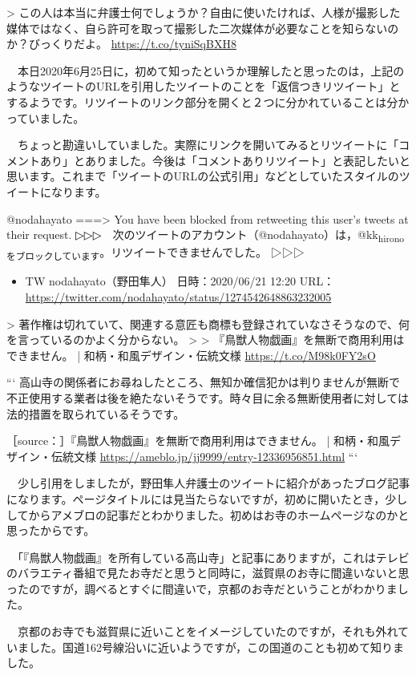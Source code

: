 \documentclass[]{ltjarticle}
\begin{document}
> この人は本当に弁護士何でしょうか？自由に使いたければ、人様が撮影した媒体ではなく、自ら許可を取って撮影した二次媒体が必要なことを知らないのか？びっくりだよ。 \url{https://t.co/tyniSqBXH8}  

　本日2020年6月25日に，初めて知ったというか理解したと思ったのは，上記のようなツイートのURLを引用したツイートのことを「返信つきリツイート」とするようです。リツイートのリンク部分を開くと２つに分かれていることは分かっていました。

　ちょっと勘違いしていました。実際にリンクを開いてみるとリツイートに「コメントあり」とありました。今後は「コメントありリツイート」と表記したいと思います。これまで「ツイートのURLの公式引用」などとしていたスタイルのツイートになります。

@nodahayato ===> You have been blocked from retweeting this user's tweets at their request.  
▷▷▷　次のツイートのアカウント（@nodahayato）は，@kk\textsubscript{hironoをブロックしています}。リツイートできませんでした。 ▷▷▷  

\begin{itemize}
\item TW nodahayato（野田隼人） 日時：2020/06/21 12:20 URL： \url{https://twitter.com/nodahayato/status/1274542648863232005}
\end{itemize}

> 著作権は切れていて、関連する意匠も商標も登録されていなさそうなので、何を言っているのかよく分からない。  
>   
> 『鳥獣人物戯画』を無断で商用利用はできません。 | 和柄・和風デザイン・伝統文様 \url{https://t.co/M98k0FY2sO}  

```
高山寺の関係者にお尋ねしたところ、無知か確信犯かは判りませんが無断で不正使用する業者は後を絶たないそうです。時々目に余る無断使用者に対しては法的措置を取られているそうです。

［source：］『鳥獣人物戯画』を無断で商用利用はできません。 | 和柄・和風デザイン・伝統文様 \url{https://ameblo.jp/jj9999/entry-12336956851.html}
```

　少し引用をしましたが，野田隼人弁護士のツイートに紹介があったブログ記事になります。ページタイトルには見当たらないですが，初めに開いたとき，少ししてからアメブロの記事だとわかりました。初めはお寺のホームページなのかと思ったからです。

　「『鳥獣人物戯画』を所有している高山寺」と記事にありますが，これはテレビのバラエティ番組で見たお寺だと思うと同時に，滋賀県のお寺に間違いないと思ったのですが，調べるとすぐに間違いで，京都のお寺だということがわかりました。

　京都のお寺でも滋賀県に近いことをイメージしていたのですが，それも外れていました。国道162号線沿いに近いようですが，この国道のことも初めて知りました。
\end{document}
